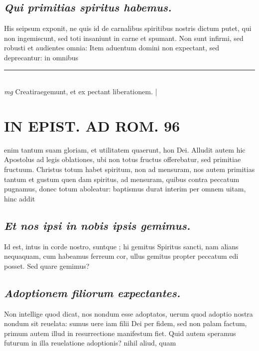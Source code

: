 \documentclass{article}
\begin{document}
\begin{pages}
\subsection*{\textit{Qui primitias spiritus habemus. }}\pstart His seipsum exponit, ne quis id de carnalibus spiritibus nostris dictum putet, qui non ingemiscunt, sed toti insaniunt in carne et spumant. Non sunt infirmi, sed robusti et audientes omnia: Item aduentum domini non expectant, sed deprecantur: in omnibus  \pend
\vspace{0.5cm}\noindent
\vspace{0.2cm}\rule{1cm}{0.2pt}\\ 
\hspace{0.2cm}\textit{mg}
\footnotesize Creatiraegemunt, et ex pectant liberationem.  
\normalsize| 
\section*{IN EPIST. AD ROM.  96 }
\marginpar{[ p.]}\pstart enim tantum suam gloriam, et utilitatem quaerunt, hon Dei. Alludit autem hic Apostolus ad legis oblationes, ubi non totus fructus offerebatur, sed primitiae fructuum. Christus totum habet spiritum, non ad mensuram, nos autem primitias tantum et gustum quen dam spiritus, ad mensuram, quibus contra peccatum pugnamus, donec totum aboleatur: baptismus durat interim per omnem uitam, hinc addit  \pend
{}
{}
\subsection*{\textit{Et nos ipsi in nobis ipsis gemimus. }}\pstart Id est, intus in corde nostro, suntque ; hi gemitus Spiritus sancti, nam alians nequaquam, cum habeamus ferreum cor, ullus gemitus propter peccatum edi posset. Sed quare gemimus?  \pend
{}
{}
\subsection*{\textit{Adoptionem filiorum expectantes. }}\pstart Non intellige quod dicat, nos nondum esse adoptatos, uerum quod adoptio nostra nondum sit reuelata: sumus uere iam filii Dei per fidem, sed non palam factum, primum autem illud in resurrectione manifestum fiet. Quid autem speramus futurum in illa reuelatione adoptionis? nihil aliud, quam  \pend
{}
{}

\end{pages}
\end{document}
